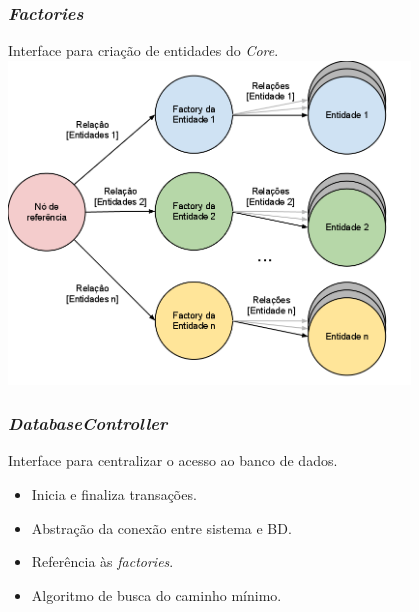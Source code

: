 \frame
{
\frametitle{\emph{Factories}}
Interface para criação de entidades do \emph{Core}.
\includegraphics[width=0.8\textwidth]{./imgs/grafoFactory.png}
}

\frame
{
\frametitle{\emph{DatabaseController}}
Interface para centralizar o acesso ao banco de dados.
\begin{itemize}
\item Inicia e finaliza transações.
\item Abstração da conexão entre sistema e BD.
\item Referência às \emph{factories}.
\item Algoritmo de busca do caminho mínimo.
\end{itemize}
}

